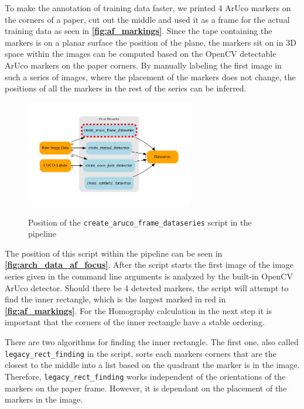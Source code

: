 \documentclass[10pt]{book}
\newcommand{\figureref}[1]{\textbf{\autoref{#1}}}
\begin{document}
To make the annotation of training data faster, we printed 4 \ac{ArUco} markers on the corners of a paper, cut out the middle and used it as a frame for the actual training data as seen in \figureref{fig:af_markings}. Since the tape containing the markers is on a planar surface the position of the plane, the markers sit on in 3D space within the images can be computed based on the \ac{OpenCV} detectable \ac{ArUco} markers on the paper corners. By manually labeling the first image in such a series of images, where the placement of the markers does not change, the positions of all the markers in the rest of the series can be inferred.

\begin{figure}
  \caption{Position of the \texttt{create\_aruco\_frame\_dataseries} script in the pipeline}
  \includegraphics[width=0.65\textwidth]{graph/arch_data_af_focus}
  \label{fig:arch_data_af_focus}
\end{figure}

The position of this script within the pipeline can be seen in \figureref{fig:arch_data_af_focus}. After the script starts the first image of the image series given in the command line arguments is analyzed by the built-in \ac{OpenCV} \ac{ArUco} detector. Should there be 4 detected markers, the script will attempt to find the inner rectangle, which is the largest marked in red in \figureref{fig:af_markings}. For the Homography calculation in the next step it is important that the corners of the inner rectangle have a stable ordering. 

There are two algorithms for finding the inner rectangle. The first one, also called \texttt{legacy\_rect\_finding} in the script, sorts each markers corners that are the closest to the middle into a list based on the quadrant the marker is in the image. Therefore, \texttt{legacy\_rect\_finding} works independent of the orientations of the markers on the paper frame. However, it is dependant on the placement of the markers in the image. 
\end{document}
